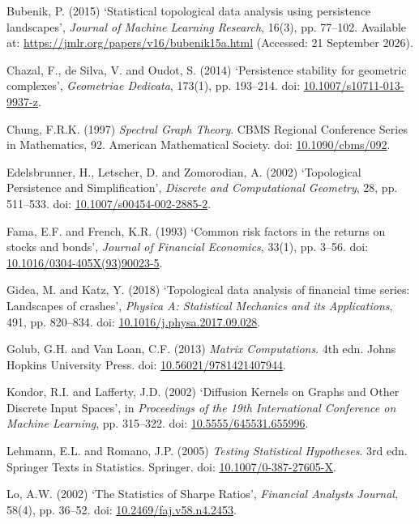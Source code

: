 \documentclass[12pt,a4paper,oneside]{article}
\newcommand{\refentry}[1]{\par\begingroup\hangindent=7mm\hangafter=1 #1\par\endgroup\vspace{4pt}}
\begin{document}
\refentry{Bubenik, P. (2015) ‘Statistical topological data analysis using persistence landscapes’, \textit{Journal of Machine Learning Research}, 16(3), pp. 77–102. Available at: \url{https://jmlr.org/papers/v16/bubenik15a.html} (Accessed: 21 September 2026).}

\refentry{Chazal, F., de Silva, V. and Oudot, S. (2014) ‘Persistence stability for geometric complexes’, \textit{Geometriae Dedicata}, 173(1), pp. 193–214. doi: \href{https://doi.org/10.1007/s10711-013-9937-z}{10.1007/s10711-013-9937-z}.}

\refentry{Chung, F.R.K. (1997) \textit{Spectral Graph Theory}. CBMS Regional Conference Series in Mathematics, 92. American Mathematical Society. doi: \href{https://doi.org/10.1090/cbms/092}{10.1090/cbms/092}.}

\refentry{Edelsbrunner, H., Letscher, D. and Zomorodian, A. (2002) ‘Topological Persistence and Simplification’, \textit{Discrete and Computational Geometry}, 28, pp. 511–533. doi: \href{https://doi.org/10.1007/s00454-002-2885-2}{10.1007/s00454-002-2885-2}.}

\refentry{Fama, E.F. and French, K.R. (1993) ‘Common risk factors in the returns on stocks and bonds’, \textit{Journal of Financial Economics}, 33(1), pp. 3–56. doi: \href{https://doi.org/10.1016/0304-405X(93)90023-5}{10.1016/0304-405X(93)90023-5}.}

\refentry{Gidea, M. and Katz, Y. (2018) ‘Topological data analysis of financial time series: Landscapes of crashes’, \textit{Physica A: Statistical Mechanics and its Applications}, 491, pp. 820–834. doi: \href{https://doi.org/10.1016/j.physa.2017.09.028}{10.1016/j.physa.2017.09.028}.}

\refentry{Golub, G.H. and Van Loan, C.F. (2013) \textit{Matrix Computations}. 4th edn. Johns Hopkins University Press. doi: \href{https://doi.org/10.56021/9781421407944}{10.56021/9781421407944}.}

\refentry{Kondor, R.I. and Lafferty, J.D. (2002) ‘Diffusion Kernels on Graphs and Other Discrete Input Spaces’, in \textit{Proceedings of the 19th International Conference on Machine Learning}, pp. 315–322. doi: \href{https://doi.org/10.5555/645531.655996}{10.5555/645531.655996}.}

\refentry{Lehmann, E.L. and Romano, J.P. (2005) \textit{Testing Statistical Hypotheses}. 3rd edn. Springer Texts in Statistics. Springer. doi: \href{https://doi.org/10.1007/0-387-27605-X}{10.1007/0-387-27605-X}.}

\refentry{Lo, A.W. (2002) ‘The Statistics of Sharpe Ratios’, \textit{Financial Analysts Journal}, 58(4), pp. 36–52. doi: \href{https://doi.org/10.2469/faj.v58.n4.2453}{10.2469/faj.v58.n4.2453}.}
\end{document}
